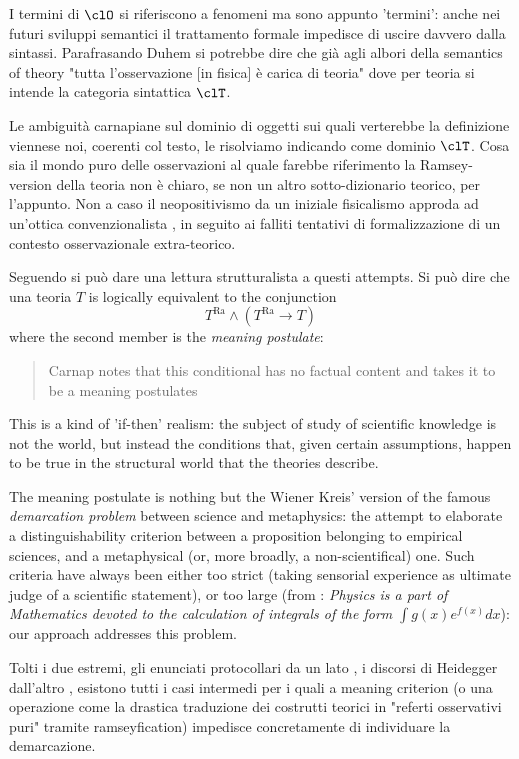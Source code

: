 I termini di $\clO$ si riferiscono a fenomeni ma sono appunto 'termini': anche nei futuri sviluppi semantici il trattamento formale impedisce di uscire davvero dalla sintassi. Parafrasando Duhem si potrebbe dire che già agli albori della semantics of theory "tutta l'osservazione [in fisica] è carica di teoria" dove per teoria si intende la categoria sintattica $\clT$.

Le ambiguità carnapiane sul dominio di oggetti sui quali verterebbe la definizione viennese noi, coerenti col testo, le risolviamo indicando come dominio $\clT$. Cosa sia il mondo puro delle osservazioni al quale farebbe riferimento la Ramsey-version della teoria non è chiaro, se non un altro sotto-dizionario teorico, per l'appunto. Non a caso il neopositivismo da un iniziale fisicalismo approda ad un'ottica convenzionalista \cite{?}, in seguito ai falliti tentativi di formalizzazione di un contesto osservazionale extra-teorico. 

Seguendo \cite{psillos} si può dare una lettura strutturalista a questi attempts. Si può dire che una teoria $T$ is logically equivalent to the conjunction
\[T^\text{Ra} \land (T^\text{Ra} \rightarrow T)
\] where the second member is the \emph{meaning postulate}:
\begin{quotation}
	Carnap notes that this conditional has no factual content and takes it to be a meaning postulates \cite{psillos}
\end{quotation}

This is a kind of 'if-then' realism: the subject of study of scientific knowledge is not the world, but instead the conditions that, given certain assumptions, happen to be true in the structural world that the theories describe.

The meaning postulate is nothing but the Wiener Kreis' version of the famous \emph{demarcation problem} between science and metaphysics: the attempt to elaborate a distinguishability criterion between a proposition belonging to empirical sciences, and a metaphysical (or, more broadly, a non-scientifical) one. Such criteria have always been either too strict (taking sensorial experience as ultimate judge of a scientific statement), or too large (from \cite{schwarz2009twisted}: \emph{Physics is a part of Mathematics devoted to the calculation of integrals of the form $\int g(x) e^{f(x)}dx$}): our approach addresses this problem.

Tolti i due estremi, gli enunciati protocollari da un lato \cite{?}, i discorsi di Heidegger dall'altro \cite{?}, esistono tutti i casi intermedi per i quali a meaning criterion (o una operazione come la drastica traduzione dei costrutti teorici in "referti osservativi puri" tramite ramseyfication) impedisce concretamente di individuare la demarcazione. 


